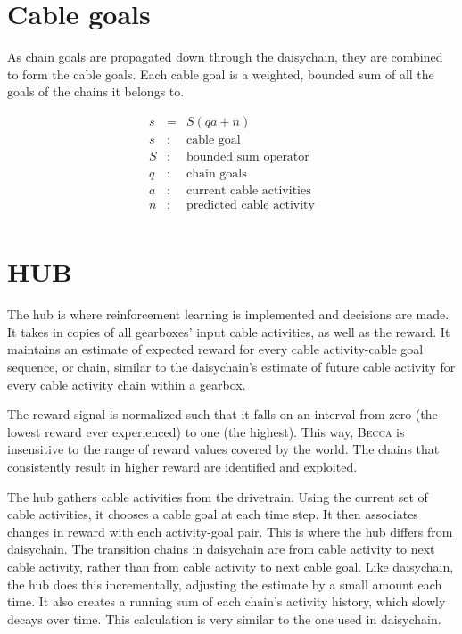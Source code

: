 \documentclass[oneside,twocolumn]{article}
\begin{document}
\section*{\color{copper} Cable goals}

As chain goals are propagated down through the daisychain, they are combined to form the cable goals. Each cable goal is a weighted, bounded sum of all the goals of the chains it belongs to.

\begin{eqnarray*}
s &= &  S(qa + n) \\
s &:& \mbox{cable goal} \\
S &:& \mbox{bounded sum operator} \\
q &:& \mbox{chain goals} \\
a &:& \mbox{current cable activities} \\
n &:& \mbox{predicted cable activity} \\
\end{eqnarray*}

\section*{\color{copper} HUB}

The hub is where reinforcement learning is implemented and decisions are made. It takes in copies of all gearboxes' input cable activities, as well as the reward. It maintains an estimate of expected reward for every cable activity-cable goal sequence, or chain, similar to the daisychain's estimate of future cable activity for every cable activity chain within a gearbox. 

The reward signal is normalized such that it falls on an interval from zero (the lowest reward ever experienced) to one (the highest). This way, \textsc{Becca} is insensitive to the range of reward values covered by the world. The chains that consistently result in higher reward are identified and exploited. 
 
The hub gathers cable activities from the drivetrain. Using the current set of cable activities, it chooses a cable goal at each time step. It then associates changes in reward with each activity-goal pair. This is where the hub differs from daisychain. The transition chains in daisychain are from cable activity to next cable activity, rather than from cable activity to next cable goal. Like daisychain, the hub does this incrementally, adjusting the estimate by a small amount each time. It also creates a running sum of each chain's activity history, which slowly decays over time. This calculation is very similar to the one used in daisychain.
\end{document}
